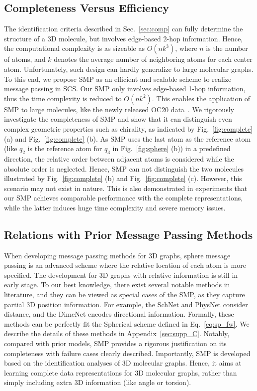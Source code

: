 \documentclass{article}
\begin{document}
\subsection{Completeness Versus Efficiency} \label{sec:comp_effi}
The identification criteria described in Sec.~\ref{sec:comp}
can fully determine the structure of a 3D molecule, but
involves edge-based 2-hop information.
Hence, the computational complexity is as sizeable as $O(nk^3)$,
where $n$ is the number of atoms, and $k$ denotes the average number
of neighboring atoms for each center atom.
Unfortunately, such design can hardly generalize to 
large molecular graphs.
To this end, we propose SMP as an efficient and scalable scheme to
realize message passing in SCS.
Our SMP only involves edge-based 1-hop information,
thus the time complexity is reduced to $O(nk^2)$.
This enables the application of SMP to large molecules,
like the newly released OC20 data~\citep{chanussot2020open}.
We rigorously investigate the completeness of SMP and 
show that it can distinguish even complex geometric 
properties such as chirality, as indicated by Fig.~\ref{fig:complete} (a) and Fig.~\ref{fig:complete} (b).
As SMP uses the last atom as the reference atom (like $q_2$ is the reference atom for $q_3$ in Fig.~\ref{fig:sphere} (b)) in a predefined direction, the relative order between adjacent atoms is considered while the absolute order is neglected.
Hence, SMP can not distinguish the two molecules illustrated by Fig.~\ref{fig:complete} (b) and Fig.~\ref{fig:complete} (c).
However, this scenario may not exist in nature. This is also demonstrated in experiments
that our SMP achieves comparable performance with the complete representations, while the latter
induces huge time complexity and severe memory issues.

\subsection{Relations with Prior Message Passing Methods}
When developing message passing methods for 3D graphs,
sphere message passing is an advanced scheme
where the relative location of each atom is more specified.
The development for 3D graphs with relative information is still in early stage.
To our best knowledge, there exist several notable methods
in literature, and they can be viewed
as special cases of the SMP, as they capture partial 3D position information.
For example, the SchNet and PhysNet consider distance, and 
the DimeNet encodes directional information.
Formally, these methods can be perfectly fit 
the Spherical scheme defined in Eq.~\ref{eq:sp_fw}.
We describe the details of these methods in Appendix~\ref{sec:supp_C}.
Notably, compared with prior models, SMP
provides a rigorous justification on 
its completeness
with failure cases clearly described.
Importantly, SMP is developed based on the
identification analyses of 3D molecular graphs.
Hence, it aims at learning complete data representations for 3D molecular graphs, rather than simply including extra 3D information (like angle or torsion). 
\end{document}
